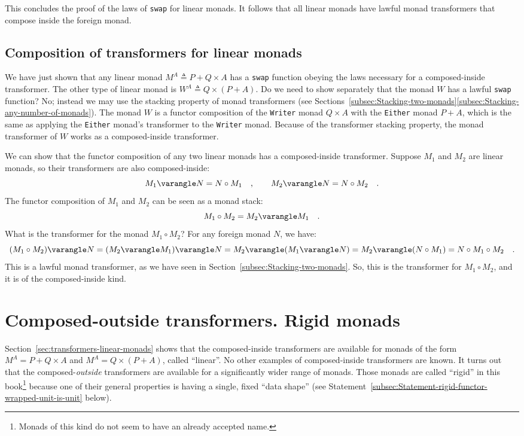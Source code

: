 This concludes the proof of the laws of \lstinline!swap! for linear
monads. It follows that all linear monads have lawful monad transformers
that compose inside the foreign monad.

\subsection{Composition of transformers for linear monads}

We have just shown that any linear monad $M^{A}\triangleq P+Q\times A$
has a \lstinline!swap! function obeying the laws necessary for a
composed-inside transformer. The other type of linear monad is $W^{A}\triangleq Q\times\left(P+A\right)$.
Do we need to show separately that the monad $W$ has a lawful \lstinline!swap!
function? No; instead we may use the stacking property of monad transformers
(see Sections~\ref{subsec:Stacking-two-monads}\textendash \ref{subsec:Stacking-any-number-of-monads}).
The monad $W$ is a functor composition of the \lstinline!Writer!
monad $Q\times A$ with the \lstinline!Either! monad $P+A$, which
is the same as applying the \lstinline!Either! monad\textsf{'}s transformer
to the \lstinline!Writer! monad. Because of the transformer stacking
property, the monad transformer of $W$ works as a composed-inside
transformer.

We can show that the functor composition of any two linear monads
has a composed-inside transformer. Suppose $M_{1}$ and $M_{2}$ are
linear monads, so their transformers are also composed-inside:
\[
M_{1}\varangle N=N\circ M_{1}\quad,\quad\quad M_{2}\varangle N=N\circ M_{2}\quad.
\]
The functor composition of $M_{1}$ and $M_{2}$ can be seen as a
monad stack:
\[
M_{1}\circ M_{2}=M_{2}\varangle M_{1}\quad.
\]
What is the transformer for the monad $M_{1}\circ M_{2}$? For any
foreign monad $N$, we have:
\[
(M_{1}\circ M_{2})\varangle N=(M_{2}\varangle M_{1})\varangle N=M_{2}\varangle(M_{1}\varangle N)=M_{2}\varangle(N\circ M_{1})=N\circ M_{1}\circ M_{2}\quad.
\]
This is a lawful monad transformer, as we have seen in Section~\ref{subsec:Stacking-two-monads}.
So, this is the transformer for $M_{1}\circ M_{2}$, and it is of
the composed-inside kind.

\section{Composed-outside transformers. Rigid monads\label{sec:transformers-rigid-monads}}

Section~\ref{sec:transformers-linear-monads} shows that the composed-inside
transformers are available for monads of the
form $M^{A}=P+Q\times A$ and $M^{A}=Q\times\left(P+A\right)$, called
\textsf{``}linear\textsf{''}. No other examples of composed-inside transformers are
known. It turns out that the composed-\emph{outside} transformers
are available for a significantly wider range of monads. Those monads
are called \textsf{``}rigid\textsf{''} in this book\footnote{Monads of this kind do not seem to have an already accepted name.}
because one of their general properties is having a single, fixed
\textsf{``}data shape\textsf{''} (see Statement~\ref{subsec:Statement-rigid-functor-wrapped-unit-is-unit}
below). 


